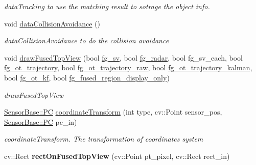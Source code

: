 \begin{DoxyCompactItemize}
\begin{DoxyCompactList}\small\item\em data\+Tracking to use the matching result to sotrage the object info. \end{DoxyCompactList}\item 
\hypertarget{class_sensor_info_aac27252b7430c306e78e19a617f1bc2d}{}void \hyperlink{class_sensor_info_aac27252b7430c306e78e19a617f1bc2d}{data\+Collision\+Avoidance} ()\label{class_sensor_info_aac27252b7430c306e78e19a617f1bc2d}

\begin{DoxyCompactList}\small\item\em data\+Collision\+Avoidance to do the collision avoidance \end{DoxyCompactList}\item 
void \hyperlink{class_sensor_info_ab35fa7516129114c548fcb12f37605c4}{draw\+Fused\+Top\+View} (bool \hyperlink{class_sensor_info_a207a7b13dd2fe49ca4a5cd7f5c183004}{fg\+\_\+sv}, bool \hyperlink{class_sensor_info_aa526e31c8b20b439088564a9b2bb86e9}{fg\+\_\+radar}, bool fg\+\_\+sv\+\_\+each, bool \hyperlink{class_sensor_info_a9317c7c2d9e06d47ba292e7784fd2b2d}{fg\+\_\+ot\+\_\+trajectory}, bool \hyperlink{class_sensor_info_a4ce1e5a2e2568e32c48f3a8aaddd298c}{fg\+\_\+ot\+\_\+trajectory\+\_\+raw}, bool \hyperlink{class_sensor_info_a72d293d7c4f782bda708990a24e33cd4}{fg\+\_\+ot\+\_\+trajectory\+\_\+kalman}, bool \hyperlink{class_sensor_info_a8d65786045ff99eddfc80f8db962e19d}{fg\+\_\+ot\+\_\+kf}, bool \hyperlink{class_sensor_info_ac8296477bcba77644ce34fac1b7087a9}{fg\+\_\+fused\+\_\+region\+\_\+display\+\_\+only})
\begin{DoxyCompactList}\small\item\em draw\+Fused\+Top\+View \end{DoxyCompactList}\item 
\hyperlink{struct_sensor_base_1_1_p_c}{Sensor\+Base\+::\+P\+C} \hyperlink{class_sensor_info_ac9705baab1609e71afe5b5599f2ab783}{coordinate\+Transform} (int type, cv\+::\+Point sensor\+\_\+pos, \hyperlink{struct_sensor_base_1_1_p_c}{Sensor\+Base\+::\+P\+C} pc\+\_\+in)
\begin{DoxyCompactList}\small\item\em coordinate\+Transform. The transformation of coordinates system \end{DoxyCompactList}\item 
\hypertarget{class_sensor_info_ac7b3c8df5b0b592711756d72c0f070c9}{}cv\+::\+Rect {\bfseries rect\+On\+Fused\+Top\+View} (cv\+::\+Point pt\+\_\+pixel, cv\+::\+Rect rect\+\_\+in)\label{class_sensor_info_ac7b3c8df5b0b592711756d72c0f070c9}


\end{DoxyCompactItemize}
